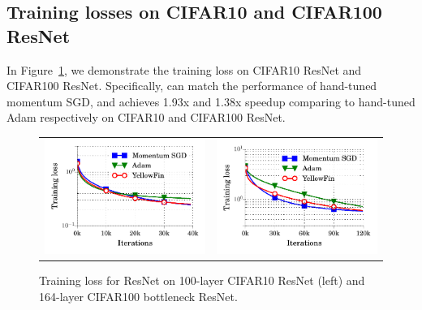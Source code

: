 \subsection{Training losses on CIFAR10 and CIFAR100 ResNet}
In Figure~\ref{fig:loss_result_cifar}, we demonstrate the training loss on CIFAR10 ResNet and CIFAR100 ResNet. Specifically, \tuner can match the performance of hand-tuned momentum SGD, and achieves 1.93x and 1.38x speedup comparing to hand-tuned Adam respectively on CIFAR10 and CIFAR100 ResNet.
\begin{figure}
\centering
	\begin{tabular}{c c}
		\includegraphics[width=0.4\linewidth]{experiment_results/resnet/resnet_loss.pdf} &
		\includegraphics[width=0.4\linewidth]{experiment_results/resnet/resnet_bottleneck_loss.pdf}
	\end{tabular}
	\caption{
	Training loss for ResNet on 100-layer CIFAR10 ResNet (left) and 164-layer CIFAR100 bottleneck ResNet. }
	\label{fig:loss_result_cifar}
\end{figure}

